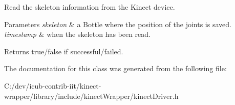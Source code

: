 Read the skeleton information from the Kinect device. 


\begin{DoxyParams}{Parameters}
{\em skeleton} & a Bottle where the position of the joints is saved. \\
\hline
{\em timestamp} & when the skeleton has been read. \\
\hline
\end{DoxyParams}
\begin{DoxyReturn}{Returns}
true/false if successful/failed. 
\end{DoxyReturn}


The documentation for this class was generated from the following file\+:\begin{DoxyCompactItemize}
\item 
C\+:/dev/icub-\/contrib-\/iit/kinect-\/wrapper/library/include/kinect\+Wrapper/kinect\+Driver.\+h\end{DoxyCompactItemize}
